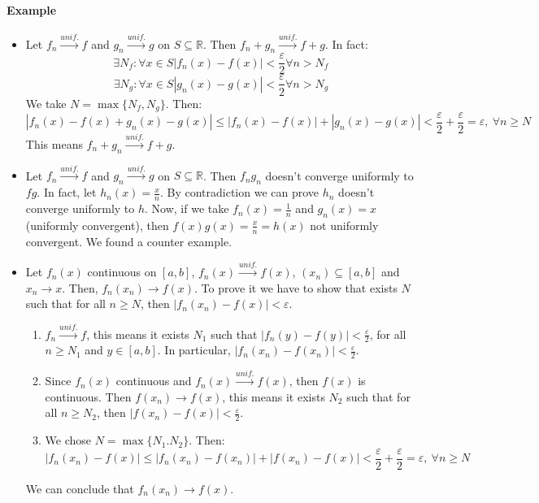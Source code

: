 \documentclass{article}
\newcommand{\abs}[1]{\left|#1\right|}
\newcommand{\tounif}{\xrightarrow{unif.}}
\newcommand{\intcc}[1]{\left[#1\right]}
\newcommand{\R}{\mathbb{R}}
\newcommand{\Ep}{\varepsilon}
\newcommand{\Example}{\paragraph{Example}}
\begin{document}
  \Example
\begin{itemize}
  \item %
  Let $f_n \tounif f$ and $g_n \tounif g$ on $S \subseteq \R$. Then $f_n + g_n
  \tounif f + g$. In fact:
\begin{equation*}
  \exists N_f : \forall x \in S \abs{f_n(x) - f(x)} < \frac{\Ep}{2} \forall n > N_f
\end{equation*}
\begin{equation*}
  \exists N_g : \forall x \in S \abs{g_n(x) - g(x)} < \frac{\Ep}{2} \forall n > N_g
\end{equation*}
  We take $N = \max \{ N_f, N_g \}$. Then:
\begin{equation*}
  \abs{f_n(x) - f(x) + g_n(x) - g(x)} \leq \abs{f_n(x) - f(x)} + \abs{g_n(x) -
  g(x)} < \frac{\Ep}{2} + \frac{\Ep}{2} = \Ep, \ \forall n \geq N
\end{equation*}
  This means $f_n + g_n \tounif f + g$.

  \item %
  Let $f_n \tounif f$ and $g_n \tounif g$ on $S \subseteq \R$. Then $f_n g_n$
  doesn't converge uniformly to $fg$. In fact, let $h_n(x) = \frac{x}{n}$.
  By contradiction we can prove $h_n$ doesn't converge uniformly to $h$. Now,
  if we take $f_n(x) = \frac{1}{n}$ and $g_n(x) = x$ (uniformly convergent),
  then $f(x) g(x) = \frac{x}{n} = h(x)$ not uniformly convergent. We found a
  counter example.

  \item %
  Let $f_n(x)$ continuous on $\intcc{a,b}$, $f_n(x) \tounif f(x)$, $(x_n)
  \subseteq \intcc{a,b}$ and $x_n \to x$. Then, $f_n(x_n) \to f(x)$. To prove it
  we have to show that exists $N$ such that for all $n \geq N$, then
  $\abs{f_n(x_n) - f(x)} < \Ep$.
  \begin{enumerate}
    \item $f_n \tounif f$, this means it exists $N_1$ such that $\abs{f_n(y) -
    f(y)} < \frac{\Ep}{2}$, for all $n \geq N_1$ and $y \in \intcc{a,b}$. In
    particular, $\abs{f_n(x_n) - f(x_n)} < \frac{\Ep}{2}$.

    \item Since $f_n(x)$ continuous and $f_n(x) \tounif f(x)$, then $f(x)$ is
    continuous. Then $f(x_n) \to f(x)$, this means it exists $N_2$ such that
    for all $n \geq N_2$, then $\abs{f(x_n) - f(x)} < \frac{\Ep}{2}$.

    \item We chose $N = \max \{ N_1. N_2 \}$. Then:
    \begin{equation*}
      \abs{f_n(x_n) - f(x)} \leq \abs{f_n(x_n) - f(x_n)} + \abs{f(x_n) - f(x)} <
      \frac{\Ep}{2} + \frac{\Ep}{2} = \Ep, \ \forall n \geq N
    \end{equation*}
  \end{enumerate}
  We can conclude that $f_n(x_n) \to f(x)$.
\end{itemize}
\end{document}
